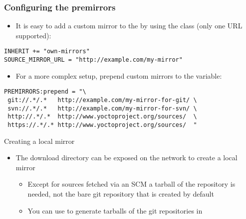 \begin{frame}[fragile]
  \frametitle{Configuring the premirrors}
  \begin{itemize}
    \item It is easy to add a custom mirror to the  by
      using the  class (only one URL supported):
  \end{itemize}
  \begin{block}{}
    \begin{verbatim}
INHERIT += "own-mirrors"
SOURCE_MIRROR_URL = "http://example.com/my-mirror"
    \end{verbatim}
  \end{block}
  \begin{itemize}
    \item For a more complex setup,  prepend custom mirrors to the
       variable:
  \end{itemize}
  \begin{block}{}
    \begin{verbatim}
PREMIRRORS:prepend = "\
 git://.*/.*   http://example.com/my-mirror-for-git/ \
 svn://.*/.*   http://example.com/my-mirror-for-svn/ \
 http://.*/.*  http://www.yoctoproject.org/sources/  \
 https://.*/.* http://www.yoctoproject.org/sources/  "
    \end{verbatim}
  \end{block}
\end{frame}

\begin{frame}{Creating a local mirror}
  \begin{itemize}
    \item The download directory can be exposed on the network to create a
      local mirror
      \begin{itemize}
        \item Except for sources fetched via an SCM a tarball of the
          repository is needed, not the bare git repository that is created
          by default
        \item You can use  to
          generate tarballs of the git repositories in 
      \end{itemize}
  \end{itemize}
\end{frame}

